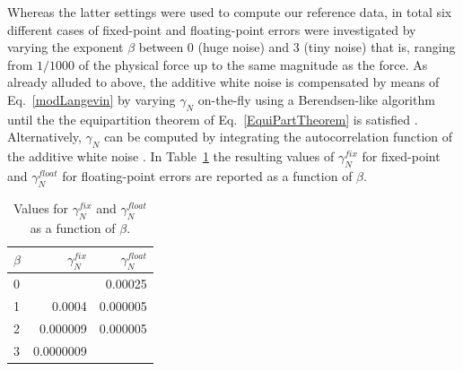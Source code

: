 \documentclass[format=acmsmall,review,timestamp,urlbreakonhyphens]{acmart}
\begin{document}
Whereas the latter settings were used to compute our reference data, in total six different cases of fixed-point and floating-point errors were investigated by varying the exponent $\beta$ between 0 (huge noise) and 3 (tiny noise) that is, ranging from $1/1000$ of the physical force up to the same magnitude as the force. %
As already alluded to above, the additive white noise is compensated by means of Eq.~\ref{modLangevin} by varying $\gamma_N$ on-the-fly using a Berendsen-like algorithm until the the equipartition theorem of Eq.~\ref{EquiPartTheorem} is satisfied \cite{Berendsen,TDKwater,TDKrev}. Alternatively, $\gamma_N$ can be computed by integrating the autocorrelation function of the additive white noise \cite{RZK}.
In Table~\ref{tab:gamma} the resulting values of \textit{\(\gamma_N^{fix}\)} for fixed-point and \textit{\(\gamma_N^{float}\)} for floating-point errors are reported as a function of \textit{\(\beta\)}. %
\begin{table}
  \caption{Values for \textit{\(\gamma_N^{fix}\)} and \textit{\(\gamma_N^{float}\)} as a function of \textit{\(\beta\)}.}
  \label{tab:gamma}
  \begin{tabular}{lrr}
    \textit{\(\beta\)} & \textit{\(\gamma_N^{fix}\)} & \textit{\(\gamma_N^{float}\)} \\
    \hline
    0 &           & 0.00025  \\
    1 & 0.0004    & 0.000005 \\
    2 & 0.000009  & 0.000005 \\
    3 & 0.0000009 &
  \end{tabular}
\end{table}
\end{document}
